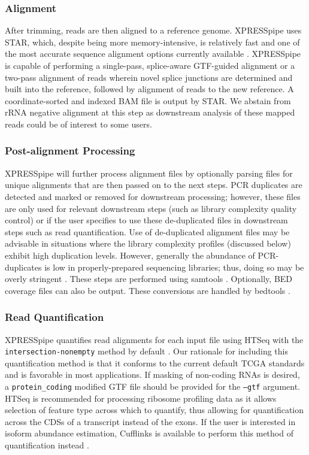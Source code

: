\documentclass[10pt, oneside]{article}
\begin{document}
\subsubsection{Alignment}
After trimming, reads are then aligned to a reference genome. XPRESSpipe uses STAR, which, despite being more memory-intensive, is relatively fast and one of the most accurate sequence alignment options currently available \cite{star, baruzzo_natmeth}. XPRESSpipe is capable of performing a single-pass, splice-aware GTF-guided alignment or a two-pass alignment of reads wherein novel splice junctions are determined and built into the reference, followed by alignment of reads to the new reference. A coordinate-sorted and indexed BAM file is output by STAR. We abstain from rRNA negative alignment at this step as downstream analysis of these mapped reads could be of interest to some users.

\subsubsection{Post-alignment Processing}
XPRESSpipe will further process alignment files by optionally parsing files for unique alignments that are then passed on to the next steps. PCR duplicates are detected and marked or removed for downstream processing; however, these files are only used for relevant downstream steps (such as library complexity quality control) or if the user specifies to use these de-duplicated files in downstream steps such as read quantification. Use of de-duplicated alignment files may be advisable in situations where the library complexity profiles (discussed below) exhibit high duplication levels. However, generally the abundance of PCR-duplicates is low in properly-prepared sequencing libraries; thus, doing so may be overly stringent \cite{umi}. These steps are performed using samtools \cite{samtools}. Optionally, BED coverage files can also be output. These conversions are handled by bedtools \cite{bedtools}.

\subsubsection{Read Quantification}
XPRESSpipe quantifies read alignments for each input file using HTSeq with the \texttt{intersection-nonempty} method by default \cite{htseq, count_benchmark}. Our rationale for including this quantification method is that it conforms to the current default TCGA standards and is favorable in most applications. If masking of non-coding RNAs is desired, a \texttt{protein\_coding} modified GTF file should be provided for the \texttt{--gtf} argument. HTSeq is recommended for processing ribosome profiling data as it allows selection of feature type across which to quantify, thus allowing for quantification across the CDSs of a transcript instead of the exons. If the user is interested in isoform abundance estimation, Cufflinks is available to perform this method of quantification instead \cite{cufflinks, count_benchmark}.
\end{document}
